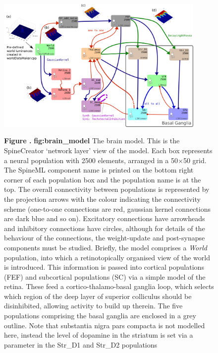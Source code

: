 \documentclass{frontiersSCNS}
\begin{document}
\begin{figure}[htb!]
\begin{center}
\includegraphics[width=0.9\textwidth]{./figures/Brain_Model.png}
\end{center}
\textbf{\label{fig:brain_model} Figure .}
{ \textbf{fig:brain\_model} The brain model. This is the SpineCreator
`network layer' view of the model. Each box represents a neural
population with 2500 elements, arranged in a 50$\times$50 grid. The
SpineML component name is printed on the bottom right corner of each
population box and the population name is at the top. The overall
connectivity between populations is represented by the projection
arrows with the colour indicating the connectivity scheme (one-to-one
connections are red, gaussian kernel connections are dark blue and so
on). Excitatory connections have arrowheads and inhibitory connections
have circles, although for details of the behaviour of the
connections, the weight-update and post-synapse components must be
studied. Briefly, the model comprises a \emph{World} population, into
which a retinotopically organised view of the world is
introduced. This information is passed into cortical populations (FEF)
and subcortical populations (SC) via a simple model of the
retina. These feed a cortico-thalamo-basal ganglia loop, which selects
which region of the deep layer of superior colliculus should be
disinhibited, allowing activity to build up therein. The five
populations comprising the basal ganglia are enclosed in a grey
outline. Note that substantia nigra pars compacta is not modelled
here, instead the level of dopamine in the striatum is set via a
parameter in the Str\_D1 and Str\_D2 populations}
\end{figure}
\end{document}
